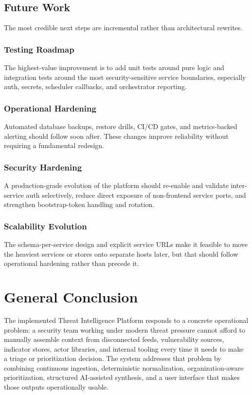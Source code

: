 \section{Future Work}
The most credible next steps are incremental rather than architectural rewrites.

\subsection{Testing Roadmap}
The highest-value improvement is to add unit tests around pure logic and integration tests around the most security-sensitive service boundaries, especially auth, secrets, scheduler callbacks, and orchestrator reporting.

\subsection{Operational Hardening}
Automated database backups, restore drills, CI/CD gates, and metrics-backed alerting should follow soon after. These changes improve reliability without requiring a fundamental redesign.

\subsection{Security Hardening}
A production-grade evolution of the platform should re-enable and validate inter-service auth selectively, reduce direct exposure of non-frontend service ports, and strengthen bootstrap-token handling and rotation.

\subsection{Scalability Evolution}
The schema-per-service design and explicit service URLs make it feasible to move the heaviest services or stores onto separate hosts later, but that should follow operational hardening rather than precede it.

\chapter*{General Conclusion}
The implemented Threat Intelligence Platform responds to a concrete operational problem: a security team working under modern threat pressure cannot afford to manually assemble context from disconnected feeds, vulnerability sources, indicator stores, actor libraries, and internal tooling every time it needs to make a triage or prioritization decision. The system addresses that problem by combining continuous ingestion, deterministic normalization, organization-aware prioritization, structured AI-assisted synthesis, and a user interface that makes those outputs operationally usable.

